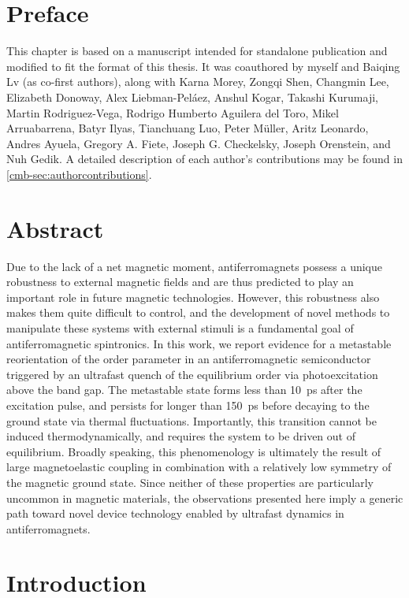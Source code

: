 \section{Preface}

This chapter is based on a manuscript intended for standalone publication and modified to fit the format of this thesis.
It was coauthored by myself and Baiqing Lv (as co-first authors), along with Karna Morey, Zongqi Shen, Changmin Lee, Elizabeth Donoway, Alex Liebman-Pel\'{a}ez, Anshul Kogar, Takashi Kurumaji, Martin Rodriguez-Vega, Rodrigo Humberto Aguilera del Toro, Mikel Arruabarrena, Batyr Ilyas, Tianchuang Luo, Peter M\"{u}ller, Aritz Leonardo, Andres Ayuela, Gregory A. Fiete, Joseph G. Checkelsky, Joseph Orenstein, and Nuh Gedik.
A detailed description of each author's contributions may be found in \cref{cmb-sec:authorcontributions}.

\section{Abstract}

Due to the lack of a net magnetic moment, antiferromagnets possess a unique robustness to external magnetic fields and are thus predicted to play an important role in future magnetic technologies.
However, this robustness also makes them quite difficult to control, and the development of novel methods to manipulate these systems with external stimuli is a fundamental goal of antiferromagnetic spintronics.
In this work, we report evidence for a metastable reorientation of the order parameter in an antiferromagnetic semiconductor triggered by an ultrafast quench of the equilibrium order via photoexcitation above the band gap.
The metastable state forms less than \qty{10}{ps} after the excitation pulse, and persists for longer than \qty{150}{ps} before decaying to the ground state via thermal fluctuations.
Importantly, this transition cannot be induced thermodynamically, and requires the system to be driven out of equilibrium.
Broadly speaking, this phenomenology is ultimately the result of large magnetoelastic coupling in combination with a relatively low symmetry of the magnetic ground state.
Since neither of these properties are particularly uncommon in magnetic materials, the observations presented here imply a generic path toward novel device technology enabled by ultrafast dynamics in antiferromagnets.

\section{Introduction}

